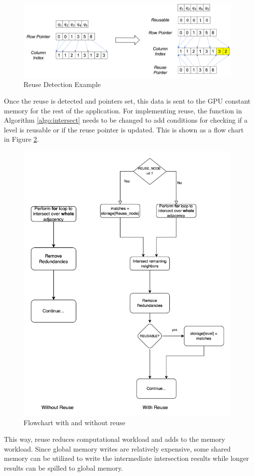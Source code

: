 {\begin{figure}
    \includegraphics[width=\textwidth]{fig/improvements/Reuse-resorting.png}
    \caption{Reuse Detection Example}
    \label{fig:reuse-detection}
\end{figure}
Once the reuse is detected and pointers set, this data is sent to the GPU constant memory for the rest of the application. For implementing reuse, the function in Algorithm \ref{algo:intersect} needs to be changed to add conditions for checking if a level is reusable or if the reuse pointer is updated. This is shown as a flow chart in Figure \ref{fig:reuse-flowchart}.
\begin{figure}
    \includegraphics[width=\textwidth]{fig/improvements/reuse-flow.png}
    \caption{Flowchart with and without reuse}
    \label{fig:reuse-flowchart}
\end{figure}
This way, reuse reduces computational workload and adds to the memory workload.
Since global memory writes are relatively expensive, some shared memory can be utilized to write the intermediate intersection results while longer results can be spilled to global memory.

}
